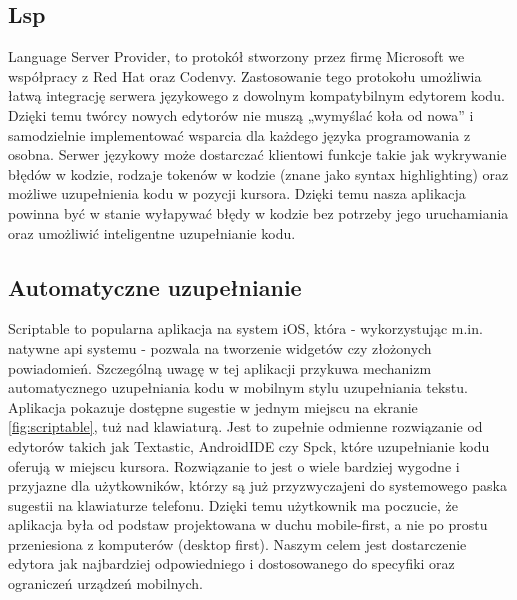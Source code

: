 \subsection{Lsp}\label{sec:lsp}
Language Server Provider, to protokół stworzony przez firmę Microsoft we współpracy z Red Hat oraz Codenvy. Zastosowanie tego protokołu umożliwia łatwą integrację serwera językowego z dowolnym kompatybilnym edytorem kodu. Dzięki temu twórcy nowych edytorów nie muszą „wymyślać koła od nowa” i samodzielnie implementować wsparcia dla każdego języka programowania z osobna.
\newline\newline
Serwer językowy może dostarczać klientowi funkcje takie jak wykrywanie błędów w kodzie, rodzaje tokenów w kodzie (znane jako syntax highlighting) oraz możliwe uzupełnienia kodu w pozycji kursora. Dzięki temu nasza aplikacja powinna być w stanie wyłapywać błędy w kodzie bez potrzeby jego uruchamiania oraz umożliwić inteligentne uzupełnianie kodu.
\subsection{Automatyczne uzupełnianie}
Scriptable to popularna aplikacja na system iOS, która - wykorzystując m.in. natywne api systemu - pozwala na tworzenie widgetów czy złożonych powiadomień.
\newline\newline
Szczególną uwagę w tej aplikacji przykuwa mechanizm automatycznego uzupełniania kodu w mobilnym stylu uzupełniania tekstu. Aplikacja pokazuje dostępne sugestie w jednym miejscu na ekranie \ref{fig:scriptable}, tuż nad klawiaturą. Jest to zupełnie odmienne rozwiązanie od edytorów takich jak Textastic, AndroidIDE czy Spck, które uzupełnianie kodu oferują w miejscu kursora.
\newline\newline
Rozwiązanie to jest o wiele bardziej wygodne i przyjazne dla użytkowników, którzy są już przyzwyczajeni do systemowego paska sugestii na klawiaturze telefonu. Dzięki temu użytkownik ma poczucie, że aplikacja była od podstaw projektowana w duchu mobile-first, a nie po prostu przeniesiona z komputerów (desktop first). Naszym celem jest dostarczenie edytora jak najbardziej odpowiedniego i dostosowanego do specyfiki oraz ograniczeń urządzeń mobilnych.
